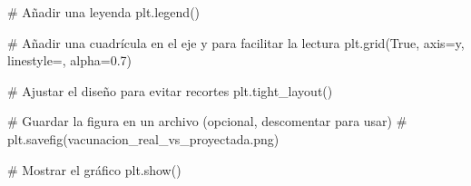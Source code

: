\documentclass[
  jou,
  floatsintext,
  longtable,
  a4paper,
  nolmodern,
  notxfonts,
  notimes,
  colorlinks=true,linkcolor=blue,citecolor=blue,urlcolor=blue]{apa7}
\newenvironment{Shaded}{\begin{snugshade}}{\end{snugshade}}
\newcommand{\CommentTok}[1]{\textcolor[rgb]{0.37,0.37,0.37}{#1}}
\newcommand{\FloatTok}[1]{\textcolor[rgb]{0.68,0.00,0.00}{#1}}
\newcommand{\NormalTok}[1]{\textcolor[rgb]{0.00,0.23,0.31}{#1}}
\newcommand{\OperatorTok}[1]{\textcolor[rgb]{0.37,0.37,0.37}{#1}}
\newcommand{\StringTok}[1]{\textcolor[rgb]{0.13,0.47,0.30}{#1}}
\newcommand{\VariableTok}[1]{\textcolor[rgb]{0.07,0.07,0.07}{#1}}
\begin{document}
\begin{Shaded}
\begin{Highlighting}[]
\CommentTok{\# Añadir una leyenda}
\NormalTok{plt.legend()}

\CommentTok{\# Añadir una cuadrícula en el eje y para facilitar la lectura}
\NormalTok{plt.grid(}\VariableTok{True}\NormalTok{, axis}\OperatorTok{=}\StringTok{\textquotesingle{}y\textquotesingle{}}\NormalTok{, linestyle}\OperatorTok{=}\StringTok{\textquotesingle{}{-}{-}\textquotesingle{}}\NormalTok{, alpha}\OperatorTok{=}\FloatTok{0.7}\NormalTok{)}

\CommentTok{\# Ajustar el diseño para evitar recortes}
\NormalTok{plt.tight\_layout()}

\CommentTok{\# Guardar la figura en un archivo (opcional, descomentar para usar)}
\CommentTok{\# plt.savefig(\textquotesingle{}vacunacion\_real\_vs\_proyectada.png\textquotesingle{})}

\CommentTok{\# Mostrar el gráfico}
\NormalTok{plt.show()}
\end{Highlighting}
\end{Shaded}
\end{document}
